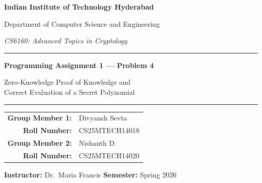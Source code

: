 \documentclass[11pt,a4paper]{article}
\begin{document}
\begin{titlepage}
\centering
\vspace*{0.6cm}
{\Large\bfseries Indian Institute of Technology Hyderabad\par}
\vspace{0.35cm}
{\large Department of Computer Science and Engineering\par}
\vspace{0.2cm}
{\large\textit{CS6160: Advanced Topics in Cryptology}\par}
\vspace{0.7cm}
\rule{0.78\textwidth}{0.6pt}\par
\vspace{0.6cm}
{\LARGE\bfseries Programming Assignment 1 --- Problem 4\par}
\vspace{0.3cm}
{\Large Zero-Knowledge Proof of Knowledge and\\ Correct Evaluation of a Secret Polynomial\par}
\vspace{0.6cm}
\rule{0.78\textwidth}{0.6pt}\par
\vspace{0.9cm}
\begin{minipage}{0.72\textwidth}
\centering
\begin{tabular}{@{}rl@{}}
\textbf{Group Member 1:} & Divyansh Sevta \\
\textbf{Roll Number:}    & CS25MTECH14018 \\
\textbf{Group Member 2:} & Nishanth D. \\
\textbf{Roll Number:}    & CS25MTECH14020 \\
\end{tabular}
\end{minipage}
\vspace{0.8cm}

\vspace{0.5cm}
{\textbf{Instructor:} Dr.~Maria Francis \qquad \textbf{Semester:} Spring 2026}
\end{titlepage}

\tableofcontents
\newpage

\begin{abstract}
We design and implement a zero-knowledge proof system by which a prover
convinces a verifier that (i) the prover knows the coefficients
$a_0,\dots,a_d \in \mathbb{Z}_q$ of a secret polynomial $P(x)$ that match
public Pedersen commitments $C_0,\dots,C_d$, and (ii) $P(z) \equiv y \pmod q$
for a publicly supplied point $z$ and claimed value $y$. The protocol is
a parallel per-coefficient $\Sigma$-protocol with a single shared
challenge, augmented by a scalar evaluation-consistency check that binds
the opening of each commitment to the claimed evaluation. We prove
completeness, $2$-special-soundness with a full-witness extractor, and
perfect honest-verifier zero-knowledge. Both a multi-round interactive
protocol and a Fiat--Shamir non-interactive variant are implemented in
pure Python 3 with only \texttt{hashlib}, \texttt{secrets}, and standard
built-ins; no external cryptographic library is used.
\end{abstract}
\end{document}
